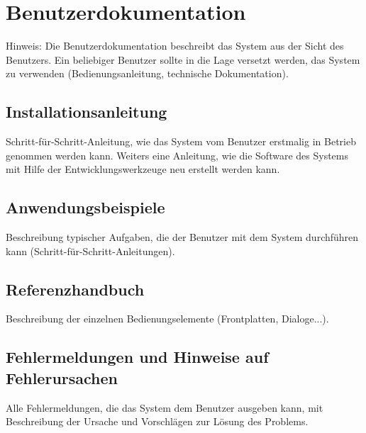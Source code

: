 \documentclass[12pt,a4paper]{article}
\newcommand{\yhbu}[0]{\color{ydkbu}}	%
\begin{document}
{\section{\sc Benutzerdokumentation}
	{\yhbu
	Hinweis: Die Benutzerdokumentation beschreibt das System aus der Sicht des
	Benutzers. Ein beliebiger Benutzer sollte in die Lage versetzt werden, das System
	zu verwenden (Bedienungsanleitung, technische Dokumentation).
	}
 \subsection{Installationsanleitung}
	{\yhbu
	Schritt-für-Schritt-Anleitung, wie das System vom Benutzer erstmalig in Betrieb
	genommen werden kann. Weiters eine Anleitung, wie die Software des Systems mit
	Hilfe der Entwicklungswerkzeuge neu erstellt werden kann.
	}
 \subsection{Anwendungsbeispiele}
	{\yhbu
	Beschreibung typischer Aufgaben, die der Benutzer mit dem System durchführen
	kann (Schritt-für-Schritt-Anleitungen).
	}
 \subsection{Referenzhandbuch}
	{\yhbu
	Beschreibung der einzelnen Bedienungselemente (Frontplatten, Dialoge...).
	}
 \subsection{Fehlermeldungen und Hinweise auf Fehlerursachen}
	{\yhbu
	Alle Fehlermeldungen, die das System dem Benutzer ausgeben kann, mit
	Beschreibung der Ursache und Vorschlägen zur Lösung des Problems.
	}









\clearpage\vfill\newpage{}
\renewcommand{\thesection}{\Roman{section}\;}
\setcounter{section}{0}
}
\end{document}
